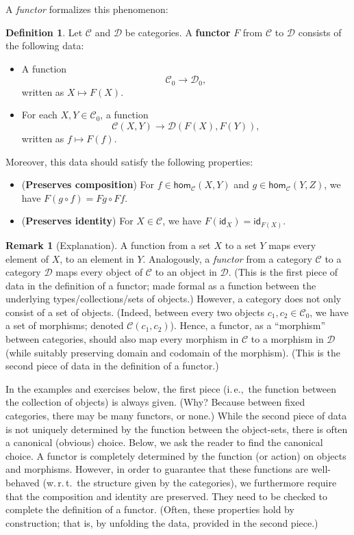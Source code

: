 \documentclass[a4paper,11pt, oneside,titlepage=false]{scrbook}
\theoremstyle{plain}
\theoremstyle{definition}
\newtheorem{rem}[thm]{Remark}
\newtheorem{dfn}[thm]{Definition}
\newcommand{\cfont}[1]{\ensuremath{\mathsf{#1}}}
\newcommand{\Cat}[1]{\mathcal{#1}}
\newcommand{\CC}{\Cat{C}}
\newcommand{\DD}{\Cat{D}}
\newcommand{\Ob}[1]{{#1}_0}
\newcommand{\Hom}[3][]{\cfont{hom}_{#1}(#2,#3)}
\newcommand{\CHom}[3]{{#1}(#2,#3)}
\newcommand{\Id}[1][]{\cfont{id}_{#1}}
\newcommand{\co}[2]{\ensuremath{#2 \circ #1}}
\begin{document}
A \textit{functor} formalizes this phenomenon:
\begin{dfn} Let $\CC$ and $\DD$ be categories. A \textbf{functor} $F$ from $\CC$ to $\DD$ consists of the following data:
\begin{itemize}
\item A function
\[
\Ob{\CC} \to \Ob{\DD},
\]
written as $X\mapsto F(X)$.
\item For each $X,Y\in \Ob{\CC}$, a function
\[
\CHom{\CC}{X}{Y} \to \CHom{\DD}{F(X)}{F(Y)},
\]
written as $f\mapsto F(f)$.
\end{itemize}
Moreover, this data should satisfy the following properties:
\begin{itemize}
\item (\textbf{Preserves composition}) For $f\in \Hom[\CC]{X}{Y}$ and $g\in \Hom[\CC]{Y}{Z}$, we have $F(\co f g) = \co {Ff}{Fg}$.
\item (\textbf{Preserves identity}) For $X\in\CC$, we have $F(\Id[X]) = \Id[F(X)]$.
\end{itemize}
\end{dfn}

\begin{rem}[Explanation]
	A function from a set $X$ to a set $Y$ maps every element of $X$, to an element in $Y$.
	Analogously, a \emph{functor} from a category $\CC$ to a category $\DD$ maps every object of $\CC$ to an object in $\DD$.
	(This is the first piece of data in the definition of a functor; made formal as a function between the underlying types/collections/sets of objects.)
	However, a category does not only consist of a set of objects.
	(Indeed, between every two objects $c_1, c_2 \in \Ob{\CC}$, we have a set of morphisms; denoted $\CHom{\CC}{c_1}{c_2}$).
	Hence, a functor, as a ``morphism'' between categories, should also map every morphism in $\CC$ to a morphism in $\DD$ (while suitably preserving domain and codomain of the morphism).
	(This is the second piece of data in the definition of a functor.)

	In the examples and exercises below, the first piece (i.\,e.,\, the function between the collection of objects) is always given.
	(Why? Because between fixed categories, there may be many functors, or none.)
	While the second piece of data is not uniquely determined by the function between the object-sets, there is often a canonical (obvious) choice.
	Below, we ask the reader to find the canonical choice.
	A functor is completely determined by the function (or action) on objects and morphisms.
	However, in order to guarantee that these functions are well-behaved (w.\,r.\,t.\ the structure given by the categories), we furthermore require that the composition and identity are preserved.
They need to be checked to complete the definition of a functor.
	(Often, these properties hold by construction; that is, by unfolding the data, provided in the second piece.)
\end{rem}
\end{document}
